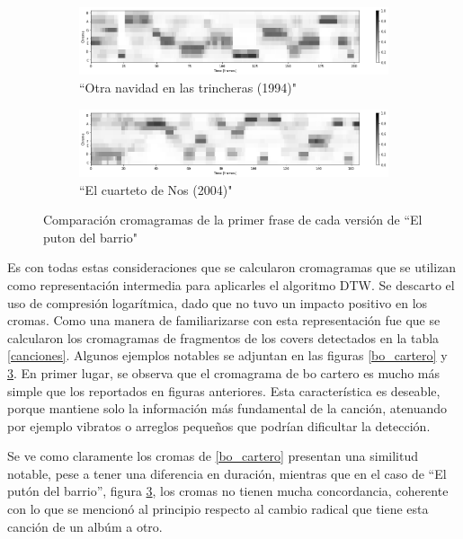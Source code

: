 \documentclass{article}
\begin{document}
\begin{figure}[!h]
\centering
\begin{subfigure}{\textwidth}
    \includegraphics[width=\textwidth]{chromas/puton_barrio_1.png}
    \caption{``Otra navidad en las trincheras (1994)"}
    \label{puton_del_barrio1}
\end{subfigure}
\vfill
\begin{subfigure}{\textwidth}
    \includegraphics[width=\textwidth]{chromas/puton_barrio_2.png}
    \caption{``El cuarteto de Nos (2004)"}
    \label{puton_del_barrio2}
\end{subfigure}
\caption{Comparación cromagramas de la primer frase de cada versión de ``El puton del barrio"}
\label{puton_del_barrio}
\end{figure}

Es con todas estas consideraciones que se calcularon cromagramas que se utilizan como representación intermedia para aplicarles el algoritmo DTW. Se descarto el uso de compresión logarítmica, dado que no tuvo un impacto positivo en los cromas. Como una manera de familiarizarse con esta representación fue que se calcularon los cromagramas de fragmentos de los covers detectados en la tabla \ref{canciones}. Algunos ejemplos notables se adjuntan en las figuras \ref{bo_cartero} y \ref{puton_del_barrio}. En primer lugar, se observa que el cromagrama de bo cartero es mucho más simple que los reportados en figuras anteriores. Esta característica es deseable, porque mantiene solo la información más fundamental de la canción, atenuando por ejemplo vibratos o arreglos pequeños que podrían dificultar la detección.

Se ve como claramente los cromas de \ref{bo_cartero} presentan una similitud notable, pese a tener una diferencia en duración, mientras que en el caso de ``El putón del barrio'', figura \ref{puton_del_barrio}, los cromas no tienen mucha concordancia, coherente con lo que se mencionó al principio respecto al cambio radical que tiene esta canción de un albúm a otro.
\end{document}
